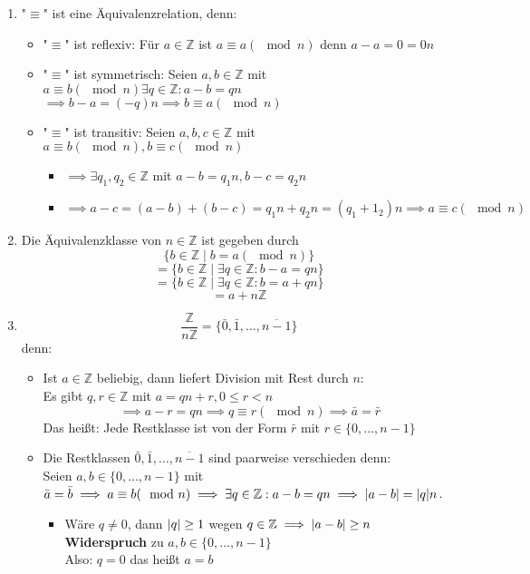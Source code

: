 \documentclass[a4paper]{scrartcl}
\DeclarePairedDelimiter\abs{\lvert}{\rvert}%
\theoremstyle{definition}
\theoremstyle{plain}
\theoremstyle{plain}
\theoremstyle{remark}
\theoremstyle{remark}
\theoremstyle{remark}
\theoremstyle{remark}
\theoremstyle{remark}
\begin{document}
\begin{enumerate}
\item "$\equiv$" ist eine Äquivalenzrelation, denn:
\begin{itemize}
\item "$\equiv$" ist reflexiv: Für $a\in\mathbb{Z}$ ist $a\equiv a(\mod n)$ denn $a - a = 0 = 0 n$
\item "$\equiv$" ist symmetrisch: Seien $a,b\in\mathbb{Z}$ mit $a\equiv b(\mod n) \exists q\in\mathbb{Z}:a - b = q n$ \\
                   $\implies b - a = (-q) n \implies b \equiv a(\mod n)$
\item "$\equiv$" ist transitiv: Seien $a,b,c\in\mathbb{Z}$ mit $a\equiv b(\mod n), b\equiv c(\mod n)$
\begin{itemize}
\item $\implies \exists q_1,q_2 \in\mathbb{Z}$ mit $a - b = q_1 n, b - c = q_2 n$
\item $\implies a - c = (a - b) + (b - c) = q_1 n + q_2 n = (q_1 + 1_2) n \implies a \equiv c(\mod n)$
\end{itemize}
\end{itemize}
\item Die Äquivalenzklasse von $n\in\mathbb{Z}$ ist gegeben durch
\[\{b\in\mathbb{Z} \mid b = a(\mod n)\}\]
\[= \{b\in\mathbb{Z} \mid \exists q\in\mathbb{Z}:b - a = qn\}\]
\[= \{b\in\mathbb{Z} \mid \exists q\in\mathbb{Z}:b = a + q n\}\]
\[= a + n\mathbb{Z} \]
\item \[\frac{\mathbb{Z}}{n\mathbb{Z}} = \{\bar 0, \bar 1, \ldots, \overline{n - 1}\}\]
                 denn:
\begin{itemize}
\item Ist $a\in\mathbb{Z}$ beliebig, dann liefert Division mit Rest durch $n$: \\
                   Es gibt $q,r\in\mathbb{Z}$ mit $a = q n + r,0\leq r < n$
                   \[\implies a - r = q n \implies q \equiv r(\mod n) \implies \bar a = \bar r\]
                   Das heißt: Jede Restklasse ist von der Form $\bar r$ mit $r\in \{0,\ldots,n - 1\}$ \\
\item Die Restklassen $\bar 0, \bar 1, \ldots, \overline{n - 1}$ sind paarweise verschieden denn: \\
                   Seien $a,b\in\{0,\ldots,n - 1\}$ mit $\bar a = \bar b \implies a \equiv b(\mod n) \implies \exists q\in \mathbb{Z}: a - b = q n \implies \abs{a - b} = \abs{q} n$.
\begin{itemize}
\item Wäre $q\neq 0$, dann $\abs{q} \geq 1$ wegen $q\in\mathbb{Z} \implies \abs{a - b} \geq n$ \textbf{Widerspruch} zu $a,b\in\{0,\ldots,n - 1\}$ \\
                         Also: $q = 0$ das heißt $a = b$
\end{itemize}
\end{itemize}
\end{enumerate}
\end{document}
